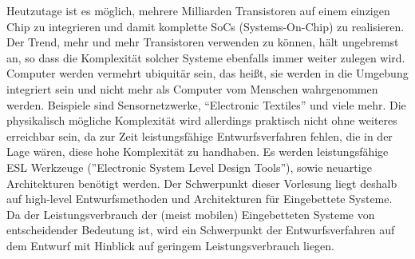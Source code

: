 \begin{module}
\begin{learningoutcomes}
\end{learningoutcomes}

\begin{content}
Heutzutage ist es möglich, mehrere Milliarden Transistoren auf einem einzigen Chip zu integrieren und damit komplette SoCs (Systems-On-Chip) zu realisieren. Der Trend, mehr und mehr Transistoren verwenden zu können, hält ungebremst an, so dass die Komplexität solcher Systeme ebenfalls immer weiter zulegen wird. Computer werden vermehrt ubiquitär sein, das heißt, sie werden in die Umgebung integriert sein und nicht mehr als Computer vom Menschen wahrgenommen werden. Beispiele sind Sensornetzwerke, “Electronic Textiles” und viele mehr. Die physikalisch mögliche Komplexität wird allerdings praktisch nicht ohne weiteres erreichbar sein, da zur Zeit leistungsfähige Entwurfsverfahren fehlen, die in der Lage wären, diese hohe Komplexität zu handhaben. Es werden leistungsfähige ESL Werkzeuge (”Electronic System Level Design Tools”), sowie neuartige Architekturen benötigt werden. Der Schwerpunkt dieser Vorlesung liegt deshalb auf high-level Entwurfsmethoden und Architekturen für Eingebettete Systeme. Da der Leistungsverbrauch der (meist mobilen) Eingebetteten Systeme von entscheidender Bedeutung ist, wird ein Schwerpunkt der Entwurfsverfahren auf dem Entwurf mit Hinblick auf geringem Leistungsverbrauch liegen.


\end{content}



\end{module}

